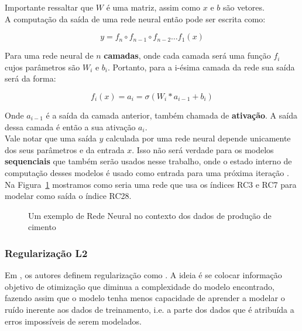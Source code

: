 Importante ressaltar que $W$ é uma matriz, assim como $x$ e $b$ são vetores. \\

A computação da saída de uma rede neural então pode ser escrita como:

\[   y = f_n \circ f_{n-1} \circ f_{n-2} \dots f_1(x)  \]

Para uma rede neural de $n$ \textbf{camadas}, onde cada camada será uma função
$f_i$ cujos parâmetros são $W_i$ e $b_i$. Portanto, para a i-ésima camada da rede
sua saída será da forma: 

\[ f_i (x)=  a_i = \sigma(W_i*a_{i-1} + b_i) \]

Onde $a_{i-1}$ é a saída da camada anterior, também chamada de
\textbf{ativação}. A saída dessa camada é então a sua ativação $a_i$. \\ 

Vale notar que uma saída $y$ calculada por uma rede neural depende unicamente dos
seus parâmetros e da entrada $x$. Isso não será verdade para os modelos
\textbf{sequenciais} que também serão usados nesse trabalho, onde o estado
interno de computação desses modelos é usado como entrada para uma próxima
iteração \citep{dlbook}. \\

Na Figura~\ref{fig:nn} mostramos como seria uma rede que usa os índices RC3 e RC7 para
modelar como saída o índice RC28. \\  

\begin{figure}
  \centering
  
  \caption{Um exemplo de Rede Neural no contexto dos dados de produção de cimento}
  \label{fig:nn}
\end{figure}


\bigskip

\subsubsection{Regularização L2}

Em \cite{dlbook}, os autores definem regularização como . A ideia é se colocar informação objetivo de 
otimização que diminua a complexidade do modelo encontrado, fazendo assim
que o modelo tenha menos capacidade de aprender a modelar o ruído inerente
aos dados de treinamento, i.e. a parte dos dados que é atribuída a erros
impossíveis de serem modelados.

